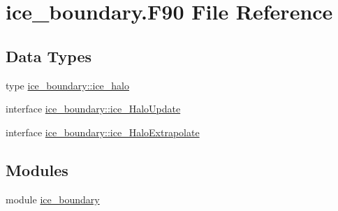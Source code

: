 \hypertarget{ice__boundary_8F90}{
\section{ice\_\-boundary.F90 File Reference}
\label{ice__boundary_8F90}
}
\subsection*{Data Types}
\begin{DoxyCompactItemize}
\item 
type \hyperlink{typeice__boundary_1_1ice__halo}{ice\_\-boundary::ice\_\-halo}
\item 
interface \hyperlink{interfaceice__boundary_1_1ice__HaloUpdate}{ice\_\-boundary::ice\_\-HaloUpdate}
\item 
interface \hyperlink{interfaceice__boundary_1_1ice__HaloExtrapolate}{ice\_\-boundary::ice\_\-HaloExtrapolate}
\end{DoxyCompactItemize}
\subsection*{Modules}
\begin{DoxyCompactItemize}
\item 
module \hyperlink{namespaceice__boundary}{ice\_\-boundary}
\end{DoxyCompactItemize}
